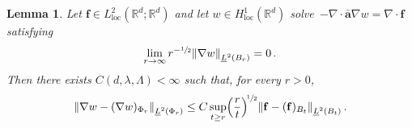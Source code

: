 \documentclass[11pt]{article} %
\numberwithin{equation}{section}
\newtheorem{lemma}[theorem]{Lemma}
\theoremstyle{definition}
\let\originalleft\left
\let\originalright\right
\renewcommand{\left}{\mathopen{}\mathclose\bgroup\originalleft}
\renewcommand{\right}{\aftergroup\egroup\originalright}
\newcommand*{\R}{\ensuremath{\mathbb{R}}}
\newcommand{\f}{\mathbf{f}}
\renewcommand{\a}{\mathbf{a}}
\newcommand{\ahom}{\bar{\a}}
\begin{document}
\begin{lemma} \label{l.harmdecay}
Let $\f\in  L_{\mathrm{loc}}^2(\R^d ; \R^d)$ and let $w \in H_{\mathrm{loc}}^1(\R^d)$ solve~$-\nabla \cdot \ahom \nabla w = \nabla \cdot \f$ satisfying
\begin{align}  \label{e.harmdecay.ass}
\lim_{r \to \infty} r^{-\sfrac12}
\left\| \nabla w \right\|_{\underline{L}^2 \left( B_{r} \right)} = 0
 \,.
\end{align}
Then there exists $C(d,\lambda,\Lambda)<\infty$ such that, for every $r>0$, 
\begin{align}  \label{e.harmdecay}
\left\| \nabla w  -  (\nabla w)_{\Phi_r} \right\|_{\underline{L}^2 \left( \Phi_{r} \right)}  
\leq 
C \sup_{t \geq r}  \Bigl( \frac{r}{t} \Bigr)^{\!\sfrac12} \left\| \f - (\f)_{B_t}  \right\|_{\underline{L}^2 \left( B_{t} \right)}  \,.
\end{align}
\end{lemma}
\end{document}
